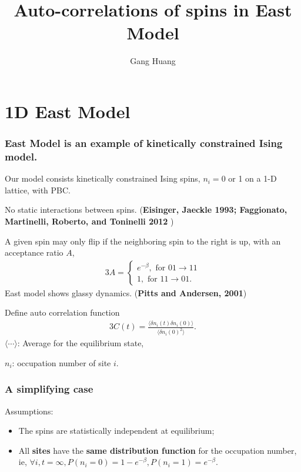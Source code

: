 \documentclass[8pt]{beamer}
\title{Auto-correlations of spins in East Model}
\author{Gang Huang}
\begin{document}
\maketitle

\section{1D East Model}
\begin{frame}
	\frametitle{East Model is an example of kinetically constrained Ising model.} 
	Our model consists kinetically constrained Ising spins, $n_i =0$ or 1 on a 1-D lattice, with PBC. 
	
	No static interactions between spins. (\textbf{Eisinger, Jaeckle 1993; Faggionato, Martinelli, Roberto, and Toninelli 2012 })
	
	A given spin may only flip if the neighboring spin to the right is up, with an acceptance ratio $A$,
     \begin{alignat}{3}
       A = \left\{
       \begin{aligned}
	     e^{-\beta}, \text{ for } 01 \to 11 \\
         1, \text{ for } 11 \to 01.
       \end{aligned}
       \right
       .
     \end{alignat}
 East model shows glassy dynamics. (\textbf{Pitts and Andersen, 2001})
 
 Define auto correlation function
      \begin{alignat}{3}
      C(t) = \frac{\langle\delta n_i(t)\delta n_i (0)\rangle}{\langle \delta n_i(0)^2 \rangle}.
 \end{alignat}
$\langle \cdots \rangle$: Average for the equilibrium state,

$n_i$: occupation number of site $i$.
\end{frame}

\begin{frame}
	\frametitle{A simplifying case}
	Assumptions:
	\begin{itemize}
		\item The spins are statistically independent at equilibrium;
		\item  All \textbf{sites} have the \textbf{same distribution function} for the occupation number, ie, $\forall i,  t=\infty,  P(n_i=0)= 1-e^{-\beta}, P(n_i =1) = e^{-\beta}$. 
	\end{itemize}	
\end{frame}
\end{document}
